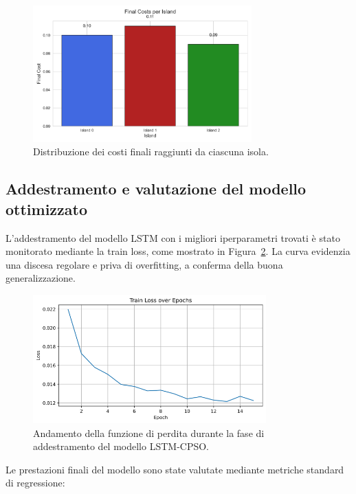 \documentclass{article}
\begin{document}
\begin{figure}[H]
    \centering
    \includegraphics[width=0.75\textwidth]{img/final_costs_per_island.png}
    \caption{Distribuzione dei costi finali raggiunti da ciascuna isola.}
    \label{fig:final_costs_hist}
\end{figure}

\subsection*{Addestramento e valutazione del modello ottimizzato}

L'addestramento del modello LSTM con i migliori iperparametri trovati è stato monitorato mediante la train loss, 
come mostrato in Figura~\ref{fig:train_loss}. 
La curva evidenzia una discesa regolare e priva di overfitting, a conferma della buona generalizzazione.

\begin{figure}[H]
    \centering
    \includegraphics[width=0.8\textwidth]{img/Train Loss.png}
    \caption{Andamento della funzione di perdita durante la fase di addestramento del modello LSTM-CPSO.}
    \label{fig:train_loss}
\end{figure}

Le prestazioni finali del modello sono state valutate mediante metriche standard di regressione:
\end{document}
